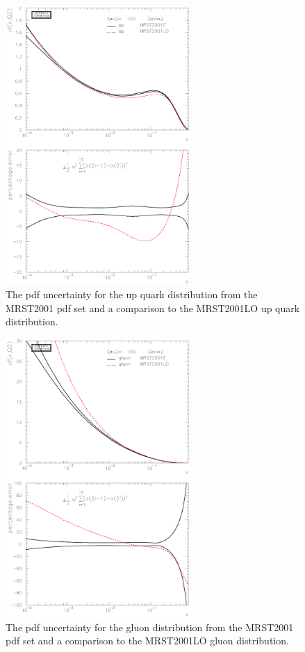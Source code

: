 \documentclass[12pt]{iopart}
\begin{document}
%
\begin{figure}[t]
\begin{center}
\includegraphics[width=7cm]{plotpaw_mrst_up.ps}
\end{center}
\caption{
The pdf uncertainty for the up quark distribution from the MRST2001 pdf set and a comparison to the MRST2001LO up quark distribution. 
\label{fig:plotpaw_mrst_up}
}
\end{figure}
%

%
\begin{figure}[t]
\begin{center}
\includegraphics[width=7cm]{plotpaw_mrst_gluon.ps}
\end{center}
\caption{
The pdf uncertainty for the gluon distribution from the MRST2001 pdf set and a comparison to the MRST2001LO gluon distribution. 
\label{fig:plotpaw_mrst_gluon}
}
\end{figure}
%
\end{document}

